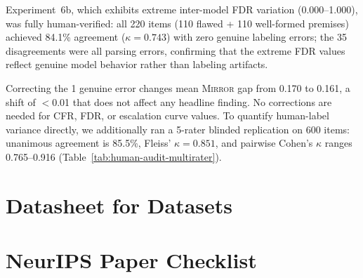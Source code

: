 \documentclass[10pt]{article}
\newcommand{\mirror}{\textsc{Mirror}}
\newcommand{\CFR}{CFR}
\newcommand{\FDR}{FDR}
\begin{document}
Experiment~6b, which exhibits extreme inter-model FDR variation (0.000--1.000),
was fully human-verified: all 220 items (110 flawed + 110 well-formed premises)
achieved 84.1\% agreement ($\kappa = 0.743$) with zero genuine labeling errors; the 35 disagreements
were all parsing errors, confirming that the extreme FDR values
reflect genuine model behavior rather than labeling artifacts.

Correcting the 1 genuine error changes mean \mirror{} gap from 0.170 to 0.161,
a shift of $<$0.01 that does not affect any headline finding. No corrections are
needed for \CFR{}, \FDR{}, or escalation curve values. To quantify human-label
variance directly, we additionally ran a 5-rater blinded replication on 600
items: unanimous agreement is 85.5\%, Fleiss' $\kappa=0.851$, and pairwise
Cohen's $\kappa$ ranges 0.765--0.916 (Table~\ref{tab:human-audit-multirater}).

\section{Datasheet for Datasets}
\label{app:datasheet}



\newpage
\section*{NeurIPS Paper Checklist}
\end{document}
